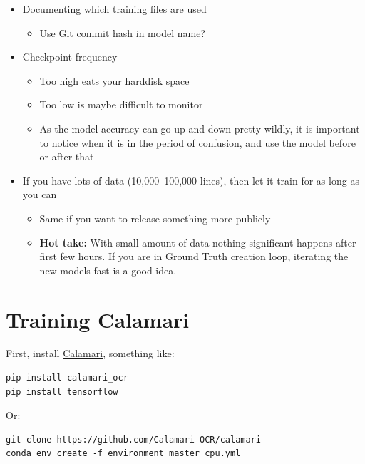 \documentclass[]{book}
\providecommand{\tightlist}{%
  \setlength{\itemsep}{0pt}\setlength{\parskip}{0pt}}
\begin{document}
\begin{itemize}
\tightlist
\item
  Documenting which training files are used

  \begin{itemize}
  \tightlist
  \item
    Use Git commit hash in model name?
  \end{itemize}
\item
  Checkpoint frequency

  \begin{itemize}
  \tightlist
  \item
    Too high eats your harddisk space
  \item
    Too low is maybe difficult to monitor
  \item
    As the model accuracy can go up and down pretty wildly, it is important to notice when it is in the period of confusion, and use the model before or after that
  \end{itemize}
\item
  If you have lots of data (10,000--100,000 lines), then let it train for as long as you can

  \begin{itemize}
  \tightlist
  \item
    Same if you want to release something more publicly
  \item
    \textbf{Hot take:} With small amount of data nothing significant happens after first few hours. If you are in Ground Truth creation loop, iterating the new models fast is a good idea.
  \end{itemize}
\end{itemize}

\hypertarget{training-calamari}{%
\section{Training Calamari}\label{training-calamari}}

First, install \href{https://github.com/Calamari-OCR/calamari}{Calamari}, something like:

\begin{verbatim}
pip install calamari_ocr
pip install tensorflow 
\end{verbatim}

Or:

\begin{verbatim}
git clone https://github.com/Calamari-OCR/calamari
conda env create -f environment_master_cpu.yml
\end{verbatim}
\end{document}
